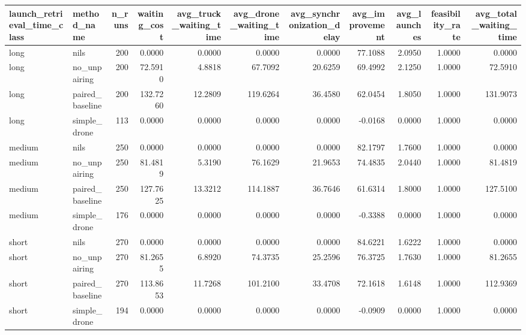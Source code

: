 \begin{tabular}{llrrrrrrrrr}
\toprule
launch_retrieval_time_class & method_name & n_runs & waiting_cost & avg_truck_waiting_time & avg_drone_waiting_time & avg_synchronization_delay & avg_improvement & avg_launches & feasibility_rate & avg_total_waiting_time \\
\midrule
long & nils & 200 & 0.0000 & 0.0000 & 0.0000 & 0.0000 & 77.1088 & 2.0950 & 1.0000 & 0.0000 \\
long & no_unpairing & 200 & 72.5910 & 4.8818 & 67.7092 & 20.6259 & 69.4992 & 2.1250 & 1.0000 & 72.5910 \\
long & paired_baseline & 200 & 132.7260 & 12.2809 & 119.6264 & 36.4580 & 62.0454 & 1.8050 & 1.0000 & 131.9073 \\
long & simple_drone & 113 & 0.0000 & 0.0000 & 0.0000 & 0.0000 & -0.0168 & 0.0000 & 1.0000 & 0.0000 \\
medium & nils & 250 & 0.0000 & 0.0000 & 0.0000 & 0.0000 & 82.1797 & 1.7600 & 1.0000 & 0.0000 \\
medium & no_unpairing & 250 & 81.4819 & 5.3190 & 76.1629 & 21.9653 & 74.4835 & 2.0440 & 1.0000 & 81.4819 \\
medium & paired_baseline & 250 & 127.7625 & 13.3212 & 114.1887 & 36.7646 & 61.6314 & 1.8000 & 1.0000 & 127.5100 \\
medium & simple_drone & 176 & 0.0000 & 0.0000 & 0.0000 & 0.0000 & -0.3388 & 0.0000 & 1.0000 & 0.0000 \\
short & nils & 270 & 0.0000 & 0.0000 & 0.0000 & 0.0000 & 84.6221 & 1.6222 & 1.0000 & 0.0000 \\
short & no_unpairing & 270 & 81.2655 & 6.8920 & 74.3735 & 25.2596 & 76.3725 & 1.7630 & 1.0000 & 81.2655 \\
short & paired_baseline & 270 & 113.8653 & 11.7268 & 101.2100 & 33.4708 & 72.1618 & 1.6148 & 1.0000 & 112.9369 \\
short & simple_drone & 194 & 0.0000 & 0.0000 & 0.0000 & 0.0000 & -0.0909 & 0.0000 & 1.0000 & 0.0000 \\
\bottomrule
\end{tabular}
